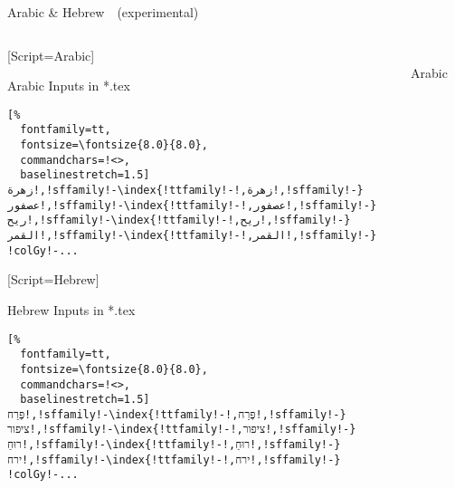 \documentclass[aspectratio=169,10pt]{beamer}
\begin{document}

\setmonofont{Noto Sans Mono}
\begin{frame}[fragile]{Arabic \& Hebrew~~{\scriptsize (experimental)}}

\begin{columns}
\begin{column}{50mm}

\setmonofont{DejaVu Sans}[Script=Arabic]
\setmainfont{Noto Sans Mono}
\setsansfont{Noto Sans}
\begin{exampleblock}{Arabic Inputs in *.tex}
\begin{Verbatim}[%
  fontfamily=tt,
  fontsize=\fontsize{8.0}{8.0},
  commandchars=!<>,
  baselinestretch=1.5]
زهرة!,!sffamily!-\index{!ttfamily!-!,زهرة!,!sffamily!-}
عصفور!,!sffamily!-\index{!ttfamily!-!,عصفور!,!sffamily!-}
ريح!,!sffamily!-\index{!ttfamily!-!,ريح!,!sffamily!-}
القمر!,!sffamily!-\index{!ttfamily!-!,القمر!,!sffamily!-}
!colGy!-...
\end{Verbatim}
\end{exampleblock}

\setmonofont{DejaVu Sans}[Script=Hebrew]
\setmainfont{Noto Sans Mono}
\setsansfont{Noto Sans}
\begin{exampleblock}{Hebrew Inputs in *.tex}
\begin{Verbatim}[%
  fontfamily=tt,
  fontsize=\fontsize{8.0}{8.0},
  commandchars=!<>,
  baselinestretch=1.5]
פֶּרַח!,!sffamily!-\index{!ttfamily!-!,פֶּרַח!,!sffamily!-}
ציפור!,!sffamily!-\index{!ttfamily!-!,ציפור!,!sffamily!-}
רוּחַ!,!sffamily!-\index{!ttfamily!-!,רוּחַ!,!sffamily!-}
ירח!,!sffamily!-\index{!ttfamily!-!,ירח!,!sffamily!-}
!colGy!-...
\end{Verbatim}
\end{exampleblock}

\end{column}

\begin{column}{79mm}

\begin{columns}
\begin{column}{39mm}
\begin{center}
\\[2mm]%
Arabic
\end{center}
\end{column}


\end{columns}
\end{column}
\end{columns}
\end{frame}
\end{document}
